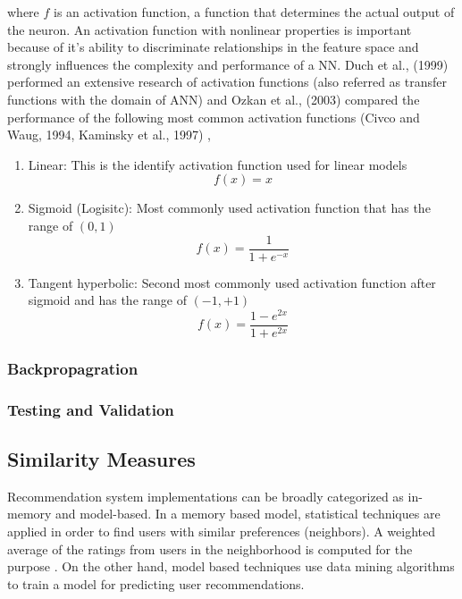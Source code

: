 \documentclass[12pt]{article}
\begin{document}
where $f$ is an activation function, a function that determines the actual output of the neuron. An activation function with nonlinear properties is important because of it's ability to discriminate relationships in the feature space and strongly influences the complexity and performance of a NN.  Duch et al., (1999) \cite{duch} performed an extensive research of activation functions (also referred as transfer functions with the domain of ANN) and Ozkan et al., (2003) \cite{ozkan} compared the performance of the following most common activation functions (Civco and Waug, 1994, Kaminsky et al., 1997) \cite{civco}, \cite{kaminsky}
\begin{enumerate}
	\item Linear: This is the identify activation function used for linear models
	\begin{equation}
	f(x) = x
	\end{equation}
	\item Sigmoid (Logisitc): Most commonly used activation function that has the range of $(0, 1)$
	\begin{equation}
	f(x) = \frac{1}{1 + e^{-x}}
	\end{equation}
	\item Tangent hyperbolic: Second most commonly used activation function after sigmoid and has the range of $(-1, +1)$
	\begin{equation}
	f(x) = \frac{1 - e^{2x}}{1 + e^{2x}}
	\end{equation}
\end{enumerate}

\subsubsection{Backpropagration}
\subsubsection{Testing and Validation}

\subsection{Similarity Measures}

Recommendation system implementations can be broadly categorized as in-memory and model-based. In a memory based model, statistical techniques are applied in order to find users with similar preferences (neighbors). A weighted average of the ratings from users in the neighborhood is computed for the purpose \cite{carrillo}. On the other hand, model based techniques use data mining algorithms to train a model for predicting user recommendations.
\end{document}
